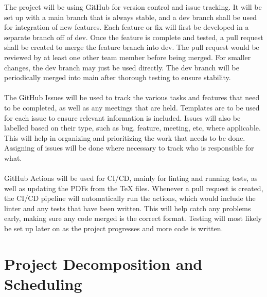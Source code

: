 \documentclass{article}
\begin{document}
  The project will be using GitHub for version control and issue tracking. 
  It will be set up with a main branch that is always stable, and
  a dev branch shall be used for integration of new features. Each feature 
  or fix will first be developed in a separate branch off of dev. 
  Once the feature is complete and tested, a pull request shall be created 
  to merge the feature branch into dev. The pull request would be 
  reviewed by at least one other team member before being merged. 
  For smaller changes, the dev branch may just be used directly. 
  The dev branch will be periodically merged into main after 
  thorough testing to ensure stability. 
  \\
  \\
  The GitHub Issues will be used to track the various tasks and features 
  that need to be completed, as well as any meetings that are held.
  Templates are to be used for each issue to ensure relevant 
  information is included. Issues will also be labelled based on their type, 
  such as bug, feature, meeting, etc, where applicable. This will help in 
  organizing and prioritizing the work that needs to be done. 
  Assigning of issues will be done where necessary to track who is responsible 
  for what.
  \\
  \\
  GitHub Actions will be used for CI/CD, mainly for linting and running tests, 
  as well as updating the PDFs from the TeX files. Whenever a pull request is 
  created, the CI/CD pipeline will automatically run the actions, which would 
  include the linter and any tests that have been written. This will help catch 
  any problems early, making sure any code merged is the correct format. 
  Testing will most likely be set up later on as the project progresses and 
  more code is written.



\section{Project Decomposition and Scheduling}
\end{document}
